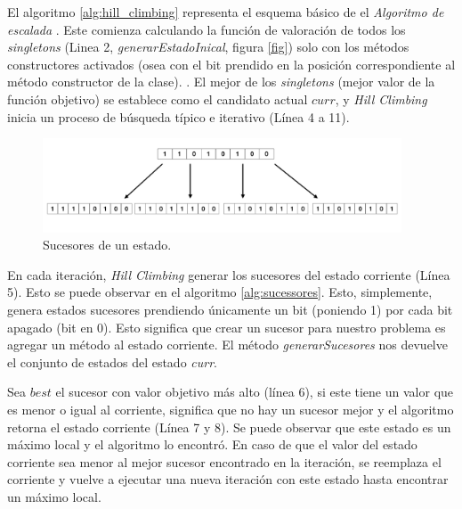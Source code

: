 El algoritmo \ref{alg:hill_climbing} representa el esquema básico de el \emph{Algoritmo de escalada} \cite{}.
Este comienza calculando la función de valoración de todos los \emph{singletons} (Linea 2, \emph{generarEstadoInical}, figura \ref{fig}) solo con los métodos constructores activados (osea con el bit prendido en la posición correspondiente al método constructor de la clase).
 . 
 El mejor de los \emph{singletons} (mejor valor de la función objetivo) se establece como el candidato actual $curr$, y \emph{Hill Climbing} inicia un proceso de búsqueda típico e iterativo (Línea 4 a 11). 

 \begin{figure}[H]
  \centering
  \includegraphics[width=0.95\textwidth]{images/succesores.png}
  \caption{Sucesores de un estado.}
  \label{fig:ncl-instances-intro}
\end{figure}

En cada iteración, \emph{Hill Climbing} generar los sucesores del estado corriente (Línea 5). Esto se puede observar en el algoritmo \ref{alg:sucessores}. 
Esto, simplemente, genera estados sucesores prendiendo únicamente un bit (poniendo 1) por cada bit apagado (bit en 0). 
Esto significa que crear un sucesor para nuestro problema es agregar un método al estado corriente. El método \emph{generarSucesores} nos devuelve el conjunto de estados del estado \emph{curr}. 

Sea $best$ el sucesor con valor objetivo más alto (línea 6), si este tiene un valor que es menor o igual al corriente, significa que no hay un sucesor mejor y el algoritmo retorna el estado corriente (Línea 7 y 8). Se puede observar que este estado es un máximo local y el algoritmo lo encontró.
En caso de que el valor del estado corriente sea menor al mejor sucesor encontrado en la iteración, se reemplaza el corriente y vuelve a ejecutar una nueva iteración con este estado hasta encontrar un máximo local. 

